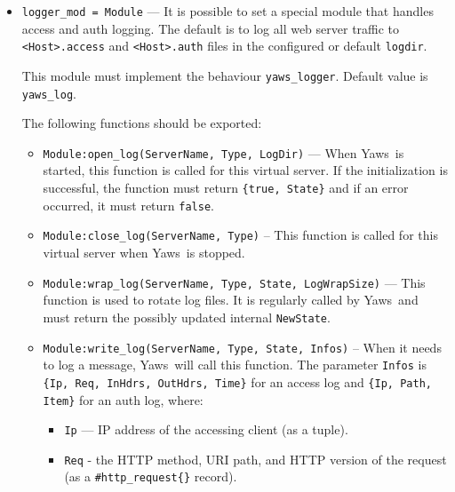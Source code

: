 \documentclass[11pt,oneside,english]{book}
\newcommand{\Yaws}            %
        {{\sc Yaws}}
\begin{document}
\begin{itemize}
\item       \verb+logger_mod = Module+ ---
              It is possible to set a special module that handles access and
              auth logging. The default is to log all web server traffic to
              \verb+<Host>.access+ and \verb+<Host>.auth+ files in the
              configured or default \verb+logdir+.

              This module must implement the behaviour
              \verb+yaws_logger+. Default value is \verb+yaws_log+.

              The following functions should be exported:

              \begin{itemize}

              \item \verb+Module:open_log(ServerName, Type, LogDir)+ --- When
                \Yaws\ is started, this function is called for this virtual
                server. If the initialization is successful, the function must
                return \verb+{true, State}+ and if an error occurred, it must
                return \verb+false+.

              \item \verb+Module:close_log(ServerName, Type)+ -- This
                function is called for this virtual server when
                \Yaws\ is stopped.

              \item \verb+Module:wrap_log(ServerName, Type, State, LogWrapSize)+
                --- This function is used to rotate log files. It is regularly
                called by \Yaws\ and must return the possibly updated internal
                \verb+NewState+.

              \item \verb+Module:write_log(ServerName, Type, State, Infos)+ --
                When it needs to log a message, \Yaws\ will call this
                function. The parameter \verb+Infos+ is
                \verb+{Ip, Req, InHdrs, OutHdrs, Time}+ for an access log and
                \verb+{Ip, Path, Item}+ for an auth log, where:

                        \begin{itemize}

                        \item \verb+Ip+ --- IP address of the
                          accessing client (as a tuple).

                        \item \verb+Req+ - the HTTP me\-thod, URI
                          path, and HTTP version of the request (as a
                          \verb+#http_request{}+ record).


\end{itemize}
\end{itemize}
\end{itemize}
\end{document}
